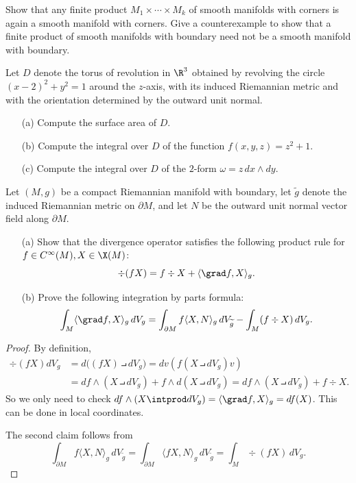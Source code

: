 \begin{exercise}
Show that any finite product $M_1\times\cdots\times M_k$ of smooth manifolds with corners is again a smooth manifold with corners. Give a counterexample to
show that a finite product of smooth manifolds with boundary need not be
a smooth manifold with boundary.
\end{exercise}
\begin{exercise}
Let $D$ denote the torus of revolution in $\R^3$ obtained by revolving the circle $(x-2)^2+y^2=1$ around the $z$-axis, with its induced Riemannian metric and with the orientation determined by the outward unit normal.
\begin{itemize}
\item[(a)] Compute the surface area of $D$.
\item[(b)] Compute the integral over $D$ of the function $f(x,y,z)=z^2+1$.
\item[(c)] Compute the integral over $D$ of the $2$-form $\omega=z\,dx\wedge dy$.
\end{itemize}
\end{exercise}
\begin{exercise}\label{div(fX) exercise}
Let $(M,g)$ be a compact Riemannian manifold with boundary, let $\widetilde{g}$ denote
the induced Riemannian metric on $\partial M$, and let $N$ be the outward unit normal vector field along $\partial M$.
\begin{itemize}
\item[(a)] Show that the divergence operator satisfies the following product rule
for $f\in C^\infty(M),X\in\X(M)$:
\[\div(fX)=f\div X+\langle\grad f,X\rangle_g.\]
\item[(b)] Prove the following integration by parts formula:
\[\int_M\langle\grad f,X\rangle_g\,dV_g=\int_{\partial M}f\langle X,N\rangle_g\,dV_{\widetilde{g}}-\int_M(f\div X)\,dV_g.\]
\end{itemize}
\end{exercise}
\begin{proof}
By definition,
\begin{align*}
\div(fX)dV_g&=d\big((fX)\intprod dV_g\big)=dv(f(X\intprod dV_g)v)\\
&=df\wedge(X\intprod dV_g)+f\wedge d(X\intprod dV_g)=df\wedge(X\intprod dV_g)+f\div X.
\end{align*}
So we only need to check $df\wedge(X\intprod dV_g)=\langle\grad f,X\rangle_g=df(X)$. This can be done in local coordinates.\par
The second claim follows from
\[\int_{\partial M}f\langle X,N\rangle_g\,dV_{\widetilde{g}}=\int_{\partial M}\langle  fX,N\rangle_g\,dV_{\widetilde{g}}=\int_M\div(fX)\,dV_g.\]
\end{proof}
